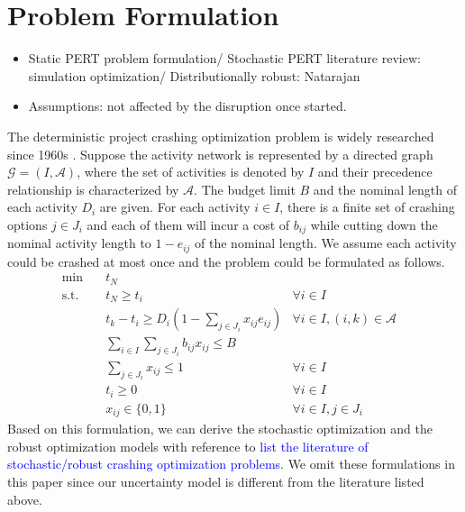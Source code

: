 \documentclass[11pt]{article}
\begin{document}
\section{Problem Formulation} \label{sec:formulation}
	\begin{itemize}
		\item Static PERT problem formulation/ Stochastic PERT literature review: simulation optimization/ Distributionally robust: Natarajan
		\item Assumptions: not affected by the disruption once started.
	\end{itemize}
	The deterministic project crashing optimization problem is widely researched since 1960s \cite{fulkerson1961network, kelley1961criticalpath}. Suppose the activity network is represented by a directed graph \(\mathcal{G} = (I,\mathcal{A})\), where the set of activities is denoted by \(I\) and their precedence relationship is characterized by \(\mathcal{A}\). The budget limit \(B\) and the nominal length of each activity \(D_i\) are given. For each activity \(i \in I\), there is a finite set of crashing options \(j \in J_i\) and each of them will incur a cost of \(b_{ij}\) while cutting down the nominal activity length to \(1 - e_{ij}\) of the nominal length.  We assume each activity could be crashed at most once and the problem could be formulated as follows. 
	\begin{subequations} \label{prob:static}
		\begin{align}
			\min \quad & t_N &\\
			\text{s.t.} \quad & t_N \geq t_i & \forall i \in I \\
			& t_k - t_i \geq D_{i}(1 - \sum_{j \in J_i} x_{ij} e_{ij}) & \forall i \in I, (i,k) \in \mathcal{A}\\
			& \sum_{i \in I} \sum_{j \in J_i} b_{ij}x_{ij} \leq B & \\
			& \sum_{j \in J_i} x_{ij} \leq 1 & \forall i \in I\\
			& t_i \geq 0 & \forall i \in I\\
			& x_{ij} \in \{0,1\} & \forall i \in I, j \in J_i&
		\end{align}
	\end{subequations}
	Based on this formulation, we can derive the stochastic optimization and the robust optimization models with reference to \textcolor{blue}{list the literature of stochastic/robust crashing optimization problems}. We omit these formulations in this paper since our uncertainty model is different from the literature listed above.\\
\end{document}
